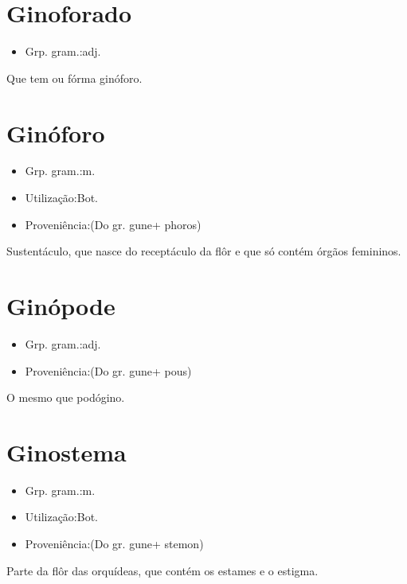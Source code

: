 \section{Ginoforado}
\begin{itemize}
\item {Grp. gram.:adj.}
\end{itemize}
Que tem ou fórma ginóforo.
\section{Ginóforo}
\begin{itemize}
\item {Grp. gram.:m.}
\end{itemize}
\begin{itemize}
\item {Utilização:Bot.}
\end{itemize}
\begin{itemize}
\item {Proveniência:(Do gr. \textunderscore gune\textunderscore  + \textunderscore phoros\textunderscore )}
\end{itemize}
Sustentáculo, que nasce do receptáculo da flôr e que só contém órgãos femininos.
\section{Ginópode}
\begin{itemize}
\item {Grp. gram.:adj.}
\end{itemize}
\begin{itemize}
\item {Proveniência:(Do gr. \textunderscore gune\textunderscore  + \textunderscore pous\textunderscore )}
\end{itemize}
O mesmo que \textunderscore podógino\textunderscore .
\section{Ginostema}
\begin{itemize}
\item {Grp. gram.:m.}
\end{itemize}
\begin{itemize}
\item {Utilização:Bot.}
\end{itemize}
\begin{itemize}
\item {Proveniência:(Do gr. \textunderscore gune\textunderscore  + \textunderscore stemon\textunderscore )}
\end{itemize}
Parte da flôr das orquídeas, que contém os estames e o estigma.
